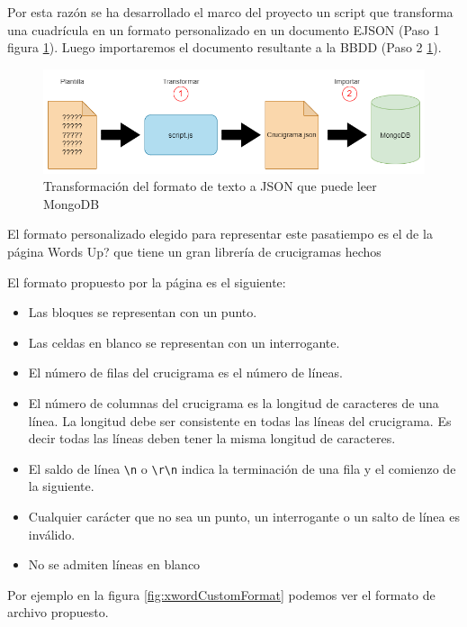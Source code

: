 \documentclass[12pt, a4paper]{article}
\begin{document}
Por esta razón se ha desarrollado el marco del proyecto un script  que transforma
una cuadrícula en un formato personalizado en un documento EJSON (Paso 1 figura
\ref{fig:framework}). Luego importaremos el documento resultante a la BBDD (Paso 2
\ref{fig:framework}).

  
\begin{figure}[h!]
	\centering
	\includegraphics[width=\linewidth]{img/framework}
	\caption{Transformación del formato de texto a JSON que puede leer MongoDB}
	\label{fig:framework}
\end{figure}

El formato personalizado elegido para representar este pasatiempo es el de
la página Words Up? \cite{wordsUp} que tiene un gran librería de crucigramas
hechos

El formato propuesto por la página es el siguiente:

\begin{itemize}
	\item Las bloques se representan con un punto.
	\item Las celdas en blanco se representan con un interrogante.
	\item El número de filas del crucigrama es el número de líneas.
	\item El número de columnas del crucigrama es la longitud de caracteres de una
	línea. La longitud debe ser consistente en todas las líneas del crucigrama. Es
	decir todas las líneas deben tener la misma longitud de caracteres.
	\item El saldo de línea \verb*|\n| o \verb*|\r\n| indica la terminación
	de una fila y el comienzo de la siguiente.
	\item Cualquier carácter que no sea un punto, un interrogante o un salto de línea
	es inválido.
	\item No se admiten líneas en blanco
\end{itemize}

Por ejemplo en la figura \ref{fig:xwordCustomFormat} podemos ver el formato de archivo
propuesto. 
\end{document}
